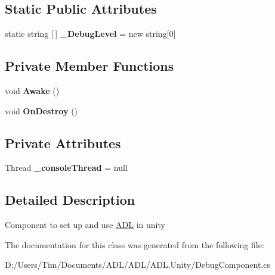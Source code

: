 \subsection*{Static Public Attributes}
\begin{DoxyCompactItemize}
\item 
\mbox{\label{class_a_d_l_1_1_unity_1_1_debug_component_aa23a2532fabf926cc33761d6891251ea}} 
static string \mbox{[}$\,$\mbox{]} {\bfseries \+\_\+\+Debug\+Level} = new string\mbox{[}0\mbox{]}
\end{DoxyCompactItemize}
\subsection*{Private Member Functions}
\begin{DoxyCompactItemize}
\item 
\mbox{\label{class_a_d_l_1_1_unity_1_1_debug_component_a510b193bc9c7db46b9a1b3cf38a25e18}} 
void {\bfseries Awake} ()
\item 
\mbox{\label{class_a_d_l_1_1_unity_1_1_debug_component_a482a448ac90c7502c94207b1baeab0ce}} 
void {\bfseries On\+Destroy} ()
\end{DoxyCompactItemize}
\subsection*{Private Attributes}
\begin{DoxyCompactItemize}
\item 
\mbox{\label{class_a_d_l_1_1_unity_1_1_debug_component_ae59c8a55238e3464fb9bb8b179bce3c2}} 
Thread {\bfseries \+\_\+console\+Thread} = null
\end{DoxyCompactItemize}


\subsection{Detailed Description}
Component to set up and use \mbox{\hyperlink{namespace_a_d_l}{A\+DL}} in unity 



The documentation for this class was generated from the following file\+:\begin{DoxyCompactItemize}
\item 
D\+:/\+Users/\+Tim/\+Documents/\+A\+D\+L/\+A\+D\+L/\+A\+D\+L.\+Unity/Debug\+Component.\+cs\end{DoxyCompactItemize}
